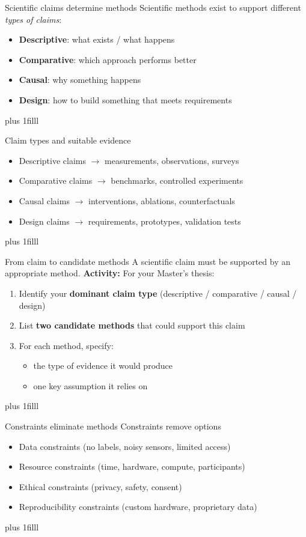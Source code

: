 \documentclass[aspectratio=169]{beamer}
\newcommand{\btVFill}{\vskip0pt plus 1filll}
\newcommand{\Activity}[1]{\textbf{Activity:} #1}
\begin{document}
\begin{frame}{Scientific claims determine methods}
  Scientific methods exist to support different \emph{types of claims}:
  \begin{itemize}
    \item \textbf{Descriptive}: what exists / what happens
    \item \textbf{Comparative}: which approach performs better
    \item \textbf{Causal}: why something happens
    \item \textbf{Design}: how to build something that meets requirements
  \end{itemize}
\btVFill
\end{frame}
\begin{frame}{Claim types and suitable evidence}
  \begin{itemize}
    \item Descriptive claims $\rightarrow$ measurements, observations, surveys
    \item Comparative claims $\rightarrow$ benchmarks, controlled experiments
    \item Causal claims $\rightarrow$ interventions, ablations, counterfactuals
    \item Design claims $\rightarrow$ requirements, prototypes, validation tests
  \end{itemize}
\btVFill
\end{frame}

\begin{frame}{From claim to candidate methods}
  A scientific claim must be supported by an appropriate method.
  \bigskip
  \Activity{
  For your Master’s thesis:
  \begin{enumerate}
    \item Identify your \textbf{dominant claim type}
      (descriptive / comparative / causal / design)
    \item List \textbf{two candidate methods} that could support this claim
    \item For each method, specify:
      \begin{itemize}
        \item the type of evidence it would produce
        \item one key assumption it relies on
      \end{itemize}
  \end{enumerate}
  }
  \btVFill
\end{frame}

\begin{frame}{Constraints eliminate methods}
  Constraints remove options
  \begin{itemize}
    \item Data constraints (no labels, noisy sensors, limited access)
    \item Resource constraints (time, hardware, compute, participants)
    \item Ethical constraints (privacy, safety, consent)
    \item Reproducibility constraints (custom hardware, proprietary data)
  \end{itemize}
 \btVFill
\end{frame}
\end{document}
